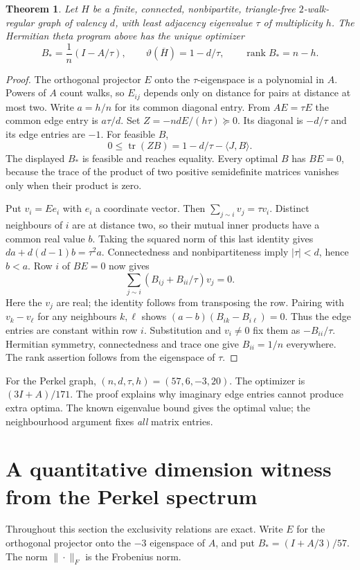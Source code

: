 \documentclass[11pt]{article}
\newtheorem{theorem}{Theorem}
\newcommand{\tr}{\operatorname{tr}}
\newcommand{\rank}{\operatorname{rank}}
\begin{document}
\begin{theorem}\label{th:family}
Let $H$ be a finite, connected, nonbipartite, triangle-free $2$-walk-regular graph of valency $d$, with least adjacency eigenvalue $\tau$ of multiplicity $h$. The Hermitian theta program above has the unique optimizer
\[
      B_*=\frac1n(I-A/\tau),\qquad
      \vartheta(\overline H)=1-d/\tau,\qquad \rank B_*=n-h.
\]
\end{theorem}
\begin{proof}
The orthogonal projector $E$ onto the $\tau$-eigenspace is a polynomial in $A$. Powers of $A$ count walks, so $E_{ij}$ depends only on distance for pairs at distance at most two. Write $a=h/n$ for its common diagonal entry. From $AE=\tau E$ the common edge entry is $a\tau/d$. Set $Z=-ndE/(h\tau)\succeq0$. Its diagonal is $-d/\tau$ and its edge entries are $-1$. For feasible $B$,
\[
   0\leq\tr(ZB)=1-d/\tau-\langle J,B\rangle.
\]
The displayed $B_*$ is feasible and reaches equality. Every optimal $B$ has $BE=0$, because the trace of the product of two positive semidefinite matrices vanishes only when their product is zero.

Put $v_i=Ee_i$ with $e_i$ a coordinate vector. Then $\sum_{j\sim i}v_j=\tau v_i$. Distinct neighbours of $i$ are at distance two, so their mutual inner products have a common real value $b$. Taking the squared norm of this last identity gives $da+d(d-1)b=\tau^2a$. Connectedness and nonbipartiteness imply $|\tau|<d$, hence $b<a$. Row $i$ of $BE=0$ now gives
\[
       \sum_{j\sim i}(B_{ij}+B_{ii}/\tau)v_j=0.
\]
Here the $v_j$ are real; the identity follows from transposing the row. Pairing with $v_k-v_\ell$ for any neighbours $k,\ell$ shows $(a-b)(B_{ik}-B_{i\ell})=0$. Thus the edge entries are constant within row $i$. Substitution and $v_i\ne0$ fix them as $-B_{ii}/\tau$. Hermitian symmetry, connectedness and trace one give $B_{ii}=1/n$ everywhere. The rank assertion follows from the eigenspace of $\tau$.
\end{proof}
For the Perkel graph, $(n,d,\tau,h)=(57,6,-3,20)$. The optimizer is $(3I+A)/171$. The proof explains why imaginary edge entries cannot produce extra optima. The known eigenvalue bound gives the optimal value; the neighbourhood argument fixes \emph{all} matrix entries.

\section{A quantitative dimension witness from the Perkel spectrum}
\label{sec:spectral-stability}
Throughout this section the exclusivity relations are exact. Write $E$ for
the orthogonal projector onto the $-3$ eigenspace of $A$, and put
$B_*=(I+A/3)/57$. The norm $\|\cdot\|_F$ is the Frobenius norm.
\end{document}
